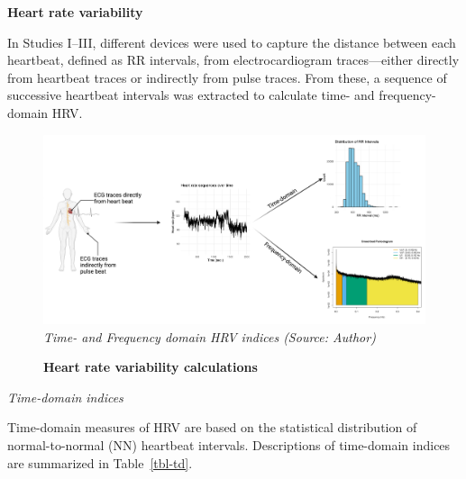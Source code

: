 \documentclass[
  a4paper,
  headsepline=true,
  open=left]{scrbook}
\begin{document}
\textbf{Heart rate variability}

In Studies I--III, different devices were used to capture the distance
between each heartbeat, defined as RR intervals, from electrocardiogram
traces---either directly from heartbeat traces or indirectly from pulse
traces. From these, a sequence of successive heartbeat intervals was
extracted to calculate time- and frequency-domain HRV.

\begin{figure}

{\centering 

\includegraphics{images/measurements_hrv.pdf} \emph{Time- and Frequency
domain HRV indices (Source: Author)}

}

\caption{\label{fig-hrv}\textbf{Heart rate variability calculations}}

\end{figure}

\emph{Time-domain indices}

Time-domain measures of HRV are based on the statistical distribution of
normal-to-normal (NN) heartbeat intervals. Descriptions of time-domain
indices are summarized in Table~\ref{tbl-td}.
\end{document}
